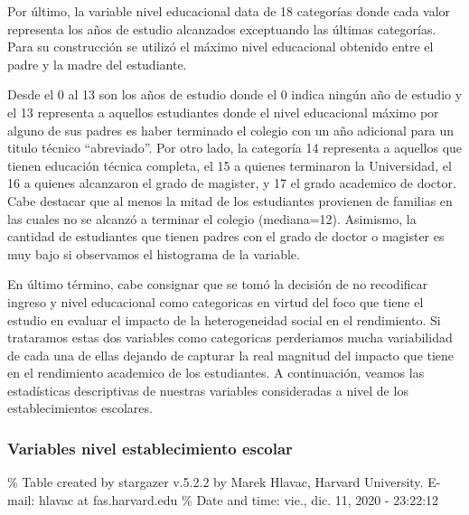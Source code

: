 \documentclass[
]{article}
\begin{document}
Por último, la variable nivel educacional data de 18 categorías donde
cada valor representa los años de estudio alcanzados exceptuando las
últimas categorías. Para su construcción se utilizó el máximo nivel
educacional obtenido entre el padre y la madre del estudiante.

Desde el 0 al 13 son los años de estudio donde el 0 indica ningún año de
estudio y el 13 representa a aquellos estudiantes donde el nivel
educacional máximo por alguno de sus padres es haber terminado el
colegio con un año adicional para un titulo técnico ``abreviado''. Por
otro lado, la categoría 14 representa a aquellos que tienen educación
técnica completa, el 15 a quienes terminaron la Universidad, el 16 a
quienes alcanzaron el grado de magister, y 17 el grado academico de
doctor. Cabe destacar que al menos la mitad de los estudiantes provienen
de familias en las cuales no se alcanzó a terminar el colegio
(mediana=12). Asimismo, la cantidad de estudiantes que tienen padres con
el grado de doctor o magister es muy bajo si observamos el histograma de
la variable.

En último término, cabe consignar que se tomó la decisión de no
recodificar ingreso y nivel educacional como categoricas en virtud del
foco que tiene el estudio en evaluar el impacto de la heterogeneidad
social en el rendimiento. Si trataramos estas dos variables como
categoricas perderiamos mucha variabilidad de cada una de ellas dejando
de capturar la real magnitud del impacto que tiene en el rendimiento
academico de los estudiantes. A continuación, veamos las estadísticas
descriptivas de nuestras variables consideradas a nivel de los
establecimientos escolares.

\hypertarget{variables-nivel-establecimiento-escolar}{%
\subsubsection{Variables nivel establecimiento
escolar}\label{variables-nivel-establecimiento-escolar}}

\% Table created by stargazer v.5.2.2 by Marek Hlavac, Harvard
University. E-mail: hlavac at fas.harvard.edu \% Date and time: vie.,
dic. 11, 2020 - 23:22:12
\end{document}
